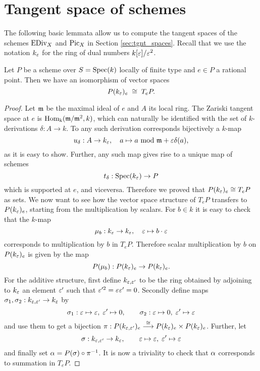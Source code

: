\section{Tangent space of schemes}
	The following basic lemmata allow us to compute the tangent spaces of the schemes $\operatorname{EDiv}_X$ and $\operatorname{Pic}_X$ in Section \ref{sec:tgnt_spaces}. Recall that we use the notation $k_\varepsilon$ for the ring of dual numbers $k[\varepsilon]/\varepsilon^2$.
		\begin{lemm}\label{lemm:tng_sch}
		Let $P$ be a scheme over $S=\operatorname{Spec}(k)$ locally of finite type and $e\in P$ a rational point. Then we have an isomorphism of vector spaces
		$$ P(k_\varepsilon)_e \; \cong \; T_e P. $$
	\end{lemm}
	\begin{proof}
		Let $\mathfrak{m}$ be the maximal ideal of $e$ and $A$ its local ring. The Zariski tangent space at $e$ is $\operatorname{Hom_k}(\mathfrak{m}/\mathfrak{m}^2, k)$, which can naturally be identified with the set of $k$-derivations $\delta:A\to k$. To any such derivation corresponds bijectively a $k$-map
		$$ u_\delta : A \to k_\varepsilon, \quad a\mapsto a \text{ mod } \mathfrak{m} + \varepsilon\delta(a), $$
		as it is easy to show. Further, any such map gives rise to a unique map of schemes
		$$ t_\delta : \operatorname{Spec}(k_\varepsilon) \to P $$
		which is supported at $e$, and viceversa. Therefore we proved that $P(k_\varepsilon)_e \cong T_e P$ as sets. We now want to see how the vector space structure of $T_e P$ transfers to $P(k_\varepsilon)_e$, starting from the multiplication by scalars. For $b\in k$ it is easy to check that the $k$-map
		$$ \mu_b : k_\varepsilon\to k_\varepsilon, \quad \varepsilon \mapsto b\cdot \varepsilon $$
		corresponds to multiplication by $b$ in $T_eP$. Therefore scalar multiplication by $b$ on $P(k_\varepsilon)_e$ is given by the map
		$$ P(\mu_b) : P(k_\varepsilon)_e \to P(k_\varepsilon)_e. $$
		For the additive structure, first define $k_{\varepsilon,\varepsilon'}$ to be the ring obtained by adjoining to $k_\varepsilon$ an element $\varepsilon'$ such that $\varepsilon'^2 = \varepsilon\varepsilon' = 0$. Secondly define maps $\sigma_1,\sigma_2 : k_{\varepsilon,\varepsilon'}\to k_\varepsilon$ by
		$$ \sigma_1: \varepsilon\mapsto \varepsilon,\; \varepsilon'\mapsto 0, \qquad \sigma_2: \varepsilon\mapsto 0,\; \varepsilon'\mapsto \varepsilon $$
		and use them to get a bijection $\pi:P(k_{\varepsilon, \varepsilon'})_e \overset{\cong}\longrightarrow P(k_\varepsilon)_e \times P(k_\varepsilon)_e $. Further, let
		$$ \sigma: k_{\varepsilon,\varepsilon'}\to k_\varepsilon, \qquad \varepsilon\mapsto \varepsilon,\; \varepsilon'\mapsto \varepsilon $$
		and finally set $\alpha = P(\sigma)\circ \pi^{-1}$. It is now a triviality to check that $\alpha$ corresponds to summation in $T_eP$.
	\end{proof}
	\begin{comment}
		It would be nice to give here a geometrical interpretation of the above result, together with a picture.
	\end{comment}

